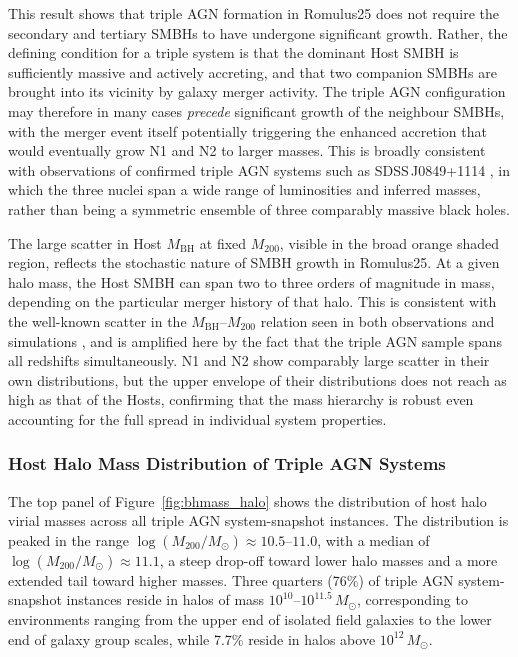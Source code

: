 \documentclass[twocolumn, 10pt]{article}
\begin{document}
This result shows that triple AGN formation in Romulus25 does not require the secondary and tertiary SMBHs to have undergone significant growth. Rather, the defining condition for a triple system is that the dominant Host SMBH is sufficiently massive and actively accreting, and that two companion SMBHs are brought into its vicinity by galaxy merger activity. The triple AGN configuration may therefore in many cases \textit{precede} significant growth of the neighbour SMBHs, with the merger event itself potentially triggering the enhanced accretion that would eventually grow N1 and N2 to larger masses. This is broadly consistent with observations of confirmed triple AGN systems such as SDSS\,J0849+1114 \citep{Pfeifle2019}, in which the three nuclei span a wide range of luminosities and inferred masses, rather than being a symmetric ensemble of three comparably massive black holes.
 
The large scatter in Host $M_\mathrm{BH}$ at fixed $M_{200}$, visible in the broad orange shaded region, reflects the stochastic nature of SMBH growth in Romulus25. At a given halo mass, the Host SMBH can span two to three orders of magnitude in mass, depending on the particular merger history of that halo. This is consistent with the well-known scatter in the $M_\mathrm{BH}$--$M_{200}$ relation seen in both observations and simulations \citep[e.g.][]{KormendyHo2013, Tremmel2017}, and is amplified here by the fact that the triple AGN sample spans all redshifts simultaneously. N1 and N2 show comparably large scatter in their own distributions, but the upper envelope of their distributions does not reach as high as that of the Hosts, confirming that the mass hierarchy is robust even accounting for the full spread in individual system properties.


\subsubsection{Host Halo Mass Distribution of Triple AGN Systems}
\label{subsubsec:halo_mass_dist}
 
The top panel of Figure~\ref{fig:bhmass_halo} shows the distribution of host halo virial masses across all triple AGN system-snapshot instances. The distribution is peaked in the range $\log(M_{200}/M_\odot) \approx 10.5$--$11.0$, with a median of $\log(M_{200}/M_\odot) \approx 11.1$, a steep drop-off toward lower halo masses and a more extended tail toward higher masses. Three quarters (76\%) of triple AGN system-snapshot instances reside in halos of mass $10^{10}$--$10^{11.5}\,M_\odot$, corresponding to environments ranging from the upper end of isolated field galaxies to the lower end of galaxy group scales, while 7.7\% reside in halos above $10^{12}\,M_\odot$.
 
\end{document}
